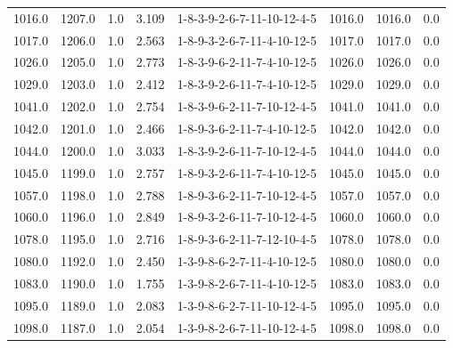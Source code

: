 \begin{tabular}{rrrrlrrr}
 1016.0 &  1207.0 &            1.0 &              3.109 &  1-8-3-9-2-6-7-11-10-12-4-5 &        1016.0 &          1016.0 &       0.0 \\
 1017.0 &  1206.0 &            1.0 &              2.563 &  1-8-9-3-2-6-7-11-4-10-12-5 &        1017.0 &          1017.0 &       0.0 \\
 1026.0 &  1205.0 &            1.0 &              2.773 &  1-8-3-9-6-2-11-7-4-10-12-5 &        1026.0 &          1026.0 &       0.0 \\
 1029.0 &  1203.0 &            1.0 &              2.412 &  1-8-3-9-2-6-11-7-4-10-12-5 &        1029.0 &          1029.0 &       0.0 \\
 1041.0 &  1202.0 &            1.0 &              2.754 &  1-8-3-9-6-2-11-7-10-12-4-5 &        1041.0 &          1041.0 &       0.0 \\
 1042.0 &  1201.0 &            1.0 &              2.466 &  1-8-9-3-6-2-11-7-4-10-12-5 &        1042.0 &          1042.0 &       0.0 \\
 1044.0 &  1200.0 &            1.0 &              3.033 &  1-8-3-9-2-6-11-7-10-12-4-5 &        1044.0 &          1044.0 &       0.0 \\
 1045.0 &  1199.0 &            1.0 &              2.757 &  1-8-9-3-2-6-11-7-4-10-12-5 &        1045.0 &          1045.0 &       0.0 \\
 1057.0 &  1198.0 &            1.0 &              2.788 &  1-8-9-3-6-2-11-7-10-12-4-5 &        1057.0 &          1057.0 &       0.0 \\
 1060.0 &  1196.0 &            1.0 &              2.849 &  1-8-9-3-2-6-11-7-10-12-4-5 &        1060.0 &          1060.0 &       0.0 \\
 1078.0 &  1195.0 &            1.0 &              2.716 &  1-8-9-3-6-2-11-7-12-10-4-5 &        1078.0 &          1078.0 &       0.0 \\
 1080.0 &  1192.0 &            1.0 &              2.450 &  1-3-9-8-6-2-7-11-4-10-12-5 &        1080.0 &          1080.0 &       0.0 \\
 1083.0 &  1190.0 &            1.0 &              1.755 &  1-3-9-8-2-6-7-11-4-10-12-5 &        1083.0 &          1083.0 &       0.0 \\
 1095.0 &  1189.0 &            1.0 &              2.083 &  1-3-9-8-6-2-7-11-10-12-4-5 &        1095.0 &          1095.0 &       0.0 \\
 1098.0 &  1187.0 &            1.0 &              2.054 &  1-3-9-8-2-6-7-11-10-12-4-5 &        1098.0 &          1098.0 &       0.0 \\

\end{tabular}
